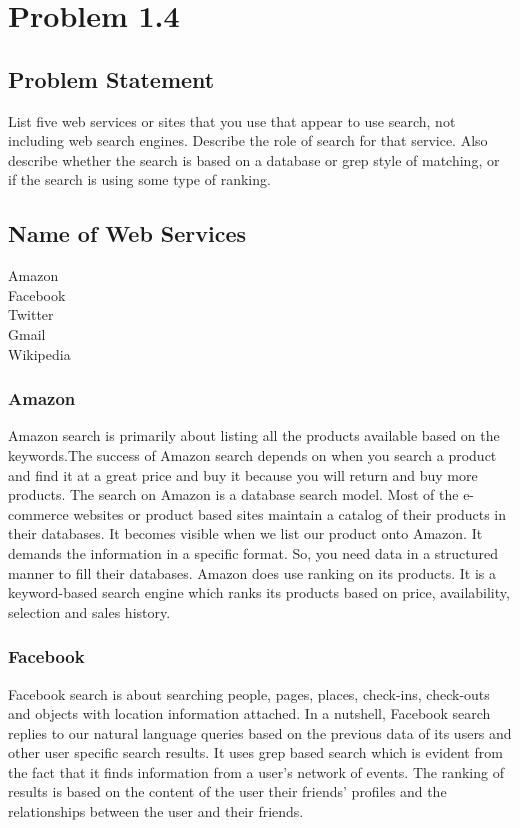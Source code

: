 \documentclass[12pt]{report}
\begin{document}
\chapter{Problem 1.4}
\section{Problem Statement}
List five web services or sites that you use that appear to use search, not including web search engines. Describe the role of search for that service. Also describe whether the search is based on a database or grep style of matching, or if the search is using some type of ranking.
\section{Name of Web Services}
Amazon\\
Facebook\\
Twitter\\
Gmail\\
Wikipedia
\subsection{Amazon}
Amazon search is primarily about listing all the products available based on the keywords.The success of Amazon search depends on when you search a product and find it at a great price and buy it because you will return and buy more products. \cite{1} The search on Amazon is a database search model. \cite{2} Most of the e-commerce websites or product based sites maintain a catalog of their products in their databases. It becomes visible when we list our product onto Amazon. It demands the information in a specific format. So, you need data in a structured manner to fill their databases. Amazon does use ranking on its products. It is a keyword-based search engine which ranks its products based on price, availability, selection and sales history. \cite{1}

\subsection{Facebook}
Facebook search is about searching people, pages, places, check-ins, check-outs and objects with location information attached. In a nutshell, Facebook search replies to our natural language queries based on the previous data of its users and other user specific search results. It uses grep based search which is evident from the fact that it finds information from a user's network of events. The ranking of results is based on the content of the user their friends’ profiles and the relationships between the user and their friends. \cite{3}
\end{document}
